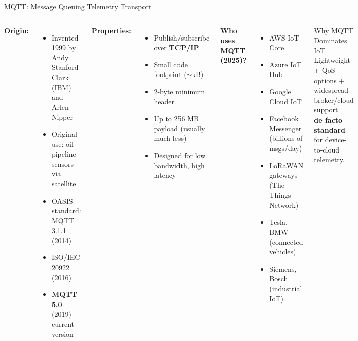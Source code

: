 \documentclass[aspectratio=169,11pt]{beamer}
\begin{document}
\begin{frame}{MQTT: Message Queuing Telemetry Transport}
    \begin{columns}
        \textbf{Origin:}
        \begin{itemize}
            \item Invented 1999 by Andy Stanford-Clark (IBM) and Arlen Nipper
            \item Original use: oil pipeline sensors via satellite
            \item OASIS standard: MQTT 3.1.1 (2014)
            \item ISO/IEC 20922 (2016)
            \item \textbf{MQTT 5.0} (2019) --- current version
        \end{itemize}
        
        \vspace{0.2cm}
        \textbf{Properties:}
        \begin{itemize}
            \item Publish/subscribe over \textbf{TCP/IP}
            \item Small code footprint ($\sim$kB)
            \item 2-byte minimum header
            \item Up to 256 MB payload (usually much less)
            \item Designed for low bandwidth, high latency
        \end{itemize}
        
        \textbf{Who uses MQTT (2025)?}
        \begin{itemize}
            \item AWS IoT Core
            \item Azure IoT Hub
            \item Google Cloud IoT
            \item Facebook Messenger (billions of msgs/day)
            \item LoRaWAN gateways (The Things Network)
            \item Tesla, BMW (connected vehicles)
            \item Siemens, Bosch (industrial IoT)
        \end{itemize}
        
        \vspace{0.2cm}
        \begin{exampleblock}{Why MQTT Dominates IoT}
            Lightweight + QoS options + widespread broker/cloud support = \textbf{de facto standard} for device-to-cloud telemetry.
        \end{exampleblock}
    \end{columns}
\end{frame}
\end{document}
